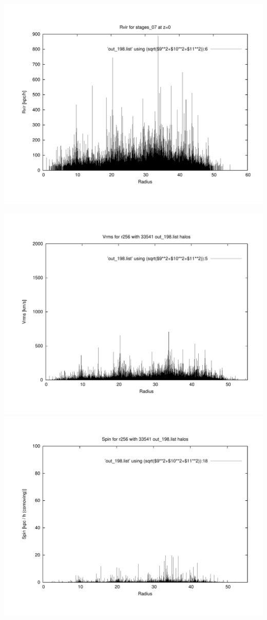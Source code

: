 \includegraphics[scale=0.3]{r256/stages_07/plot_rvir_z0.pdf}

\includegraphics[scale=0.3]{r256/stages_07/plot_Vrms_out_198.pdf}
\includegraphics[scale=0.3]{r256/stages_07/plot_spin_out_198.pdf}


